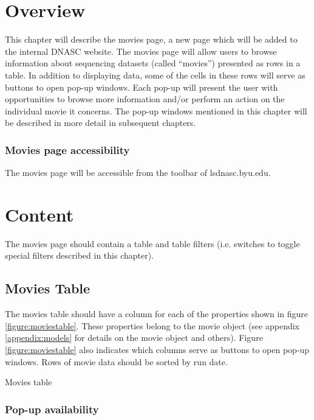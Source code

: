 
\section{Overview}

This chapter will describe the movies page, a new page which will be added to the internal 
DNASC website. The movies page will allow users to browse information about sequencing datasets 
(called ``movies'') presented as rows in a table. In addition to displaying data, some of the 
cells in these rows will serve as buttons to open pop-up windows. Each pop-up will present 
the user with opportunities to browse more information and/or perform an action on the 
individual movie it concerns. The pop-up windows mentioned in this chapter will be described 
in more detail in subsequent chapters. 

\subsubsection{Movies page accessibility}

The movies page will be accessible from the toolbar of lsdnasc.byu.edu.

\section{Content}

The movies page should contain a table and table filters (i.e. switches to toggle special 
filters described in this chapter).

\subsection{Movies Table}

The movies table should have a column for each of the properties shown in figure 
\ref{figure:moviestable}. These properties belong to the movie object (see appendix 
\ref{appendix:models} for details on the movie object and others). Figure 
\ref{figure:moviestable} also indicates which columns serve as buttons to open pop-up 
windows. Rows of movie data should be sorted by run date.

\begin{table}[h]
    
    \caption{Movies table}
    \label{figure:moviestable}
\end{table}

\subsubsection{Pop-up availability}

